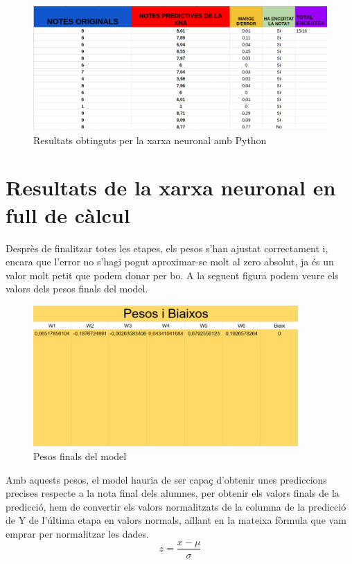 \begin{figure}[h!]
 \centering
 \includegraphics[width=1\textwidth]{./figures/Resultats.png}
 \caption{Resultats obtinguts per la xarxa neuronal amb Python}
 \label{f:resultats}
\end{figure}


\section{Resultats de la xarxa neuronal en full de càlcul}\label{sec: full de càlcul}
Desprès de finalitzar totes les etapes, els pesos s'han ajustat correctament i, encara que l'error no s'hagi pogut aproximar-se molt al zero absolut, ja és un valor molt petit que podem donar per bo. A la seguent figura podem veure els valors dels pesos finals del model.

\vspace*{1truecm}
\begin{figure}[H]
    \centering
    \includegraphics[width=0.9\textwidth]{./figures/Pesos_finals.png}
    \caption{Pesos finals del model}
\end{figure}

\clearpage
Amb aquests pesos, el model hauria de ser capaç d'obtenir unes prediccions precises respecte a la nota final dels alumnes, per obtenir els valors finals de la predicció, hem de convertir els valors normalitzats de la columna de la predicció de Y de l'última etapa en valors normals, aïllant en la mateixa fòrmula que vam emprar per normalitzar les dades.
$$z = \frac{x - \mu}{\sigma}$$

